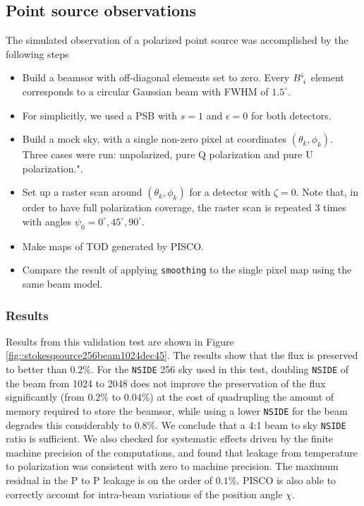 \documentclass[a4paper,11pt]{article}
\begin{document}
\subsection{Point source observations}

The simulated observation of a polarized point source was accomplished by the following steps

\begin{itemize}
    \item Build a beamsor with off-diagonal elements set to zero. Every $\tensor{B}{^i_i}$ element corresponds to a circular Gaussian beam with FWHM of $1.5^\circ$. 
    \item For simplicitly, we used a PSB with $s=1$ and $\epsilon=0$ for both detectors.
	\item Build a mock sky, with a single non-zero pixel at coordinates $(\theta_k,\phi_k)$. Three cases were run: unpolarized, pure Q polarization and pure U polarization.".
	\item Set up a raster scan around $(\theta_k,\phi_k)$ for a detector with $\zeta=0$. Note that, in order to have full polarization coverage, the raster scan is repeated 3 times with angles $\psi_0 = 0^{\circ},45^{\circ},90^{\circ}$.
	\item Make maps of TOD generated by PISCO.
	\item Compare the result of applying \texttt{smoothing} to the single pixel map using the same beam model.
\end{itemize}

\subsubsection{Results}

Results from this validation test are shown in Figure \ref{fig::stokesqsource256beam1024dec45}. The results show that the flux is preserved to better than $0.2\%$. For the \texttt{NSIDE} 256 sky used in this test, doubling \texttt{NSIDE} of the beam from 1024 to 2048 does not improve the preservation of the flux significantly (from $0.2$\% to $0.04$\%) at the cost of quadrupling the amount of memory required to store the beamsor, while using a lower \texttt{NSIDE} for the beam degrades this considerably to $0.8$\%. We conclude that a 4:1 beam to sky \texttt{NSIDE} ratio is sufficient. We also checked for systematic effects driven by the finite machine precision of the computations, and found that leakage from temperature to polarization was consistent with zero to machine precision. The maximum residual in the P to P leakage is on the order of $0.1\%$. PISCO is also able to correctly account for intra-beam variations of the position angle $\chi$.
\end{document}
